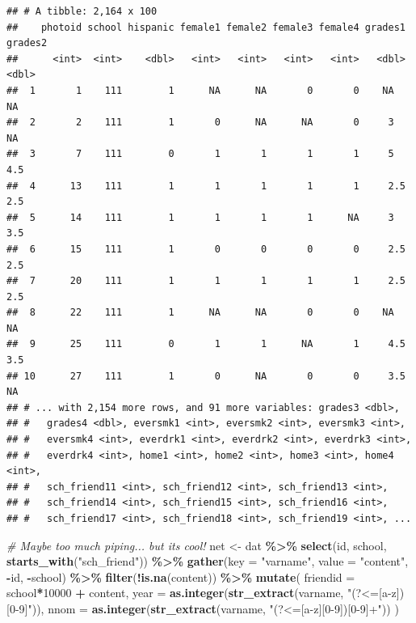 \documentclass[
]{book}
\newenvironment{Shaded}{\begin{snugshade}}{\end{snugshade}}
\newcommand{\AttributeTok}[1]{\textcolor[rgb]{0.13,0.29,0.53}{#1}}
\newcommand{\CommentTok}[1]{\textcolor[rgb]{0.56,0.35,0.01}{\textit{#1}}}
\newcommand{\DecValTok}[1]{\textcolor[rgb]{0.00,0.00,0.81}{#1}}
\newcommand{\FunctionTok}[1]{\textcolor[rgb]{0.13,0.29,0.53}{\textbf{#1}}}
\newcommand{\NormalTok}[1]{#1}
\newcommand{\OtherTok}[1]{\textcolor[rgb]{0.56,0.35,0.01}{#1}}
\newcommand{\SpecialCharTok}[1]{\textcolor[rgb]{0.81,0.36,0.00}{\textbf{#1}}}
\newcommand{\StringTok}[1]{\textcolor[rgb]{0.31,0.60,0.02}{#1}}
\begin{document}
\begin{verbatim}
## # A tibble: 2,164 x 100
##    photoid school hispanic female1 female2 female3 female4 grades1 grades2
##      <int>  <int>    <dbl>   <int>   <int>   <int>   <int>   <dbl>   <dbl>
##  1       1    111        1      NA      NA       0       0    NA      NA  
##  2       2    111        1       0      NA      NA       0     3      NA  
##  3       7    111        0       1       1       1       1     5       4.5
##  4      13    111        1       1       1       1       1     2.5     2.5
##  5      14    111        1       1       1       1      NA     3       3.5
##  6      15    111        1       0       0       0       0     2.5     2.5
##  7      20    111        1       1       1       1       1     2.5     2.5
##  8      22    111        1      NA      NA       0       0    NA      NA  
##  9      25    111        0       1       1      NA       1     4.5     3.5
## 10      27    111        1       0      NA       0       0     3.5    NA  
## # ... with 2,154 more rows, and 91 more variables: grades3 <dbl>,
## #   grades4 <dbl>, eversmk1 <int>, eversmk2 <int>, eversmk3 <int>,
## #   eversmk4 <int>, everdrk1 <int>, everdrk2 <int>, everdrk3 <int>,
## #   everdrk4 <int>, home1 <int>, home2 <int>, home3 <int>, home4 <int>,
## #   sch_friend11 <int>, sch_friend12 <int>, sch_friend13 <int>,
## #   sch_friend14 <int>, sch_friend15 <int>, sch_friend16 <int>,
## #   sch_friend17 <int>, sch_friend18 <int>, sch_friend19 <int>, ...
\end{verbatim}

\begin{Shaded}
\begin{Highlighting}[]
\CommentTok{\# Maybe too much piping... but its cool!}
\NormalTok{net }\OtherTok{\textless{}{-}}\NormalTok{ dat }\SpecialCharTok{\%\textgreater{}\%} 
  \FunctionTok{select}\NormalTok{(id, school, }\FunctionTok{starts\_with}\NormalTok{(}\StringTok{"sch\_friend"}\NormalTok{)) }\SpecialCharTok{\%\textgreater{}\%}
  \FunctionTok{gather}\NormalTok{(}\AttributeTok{key =} \StringTok{"varname"}\NormalTok{, }\AttributeTok{value =} \StringTok{"content"}\NormalTok{, }\SpecialCharTok{{-}}\NormalTok{id, }\SpecialCharTok{{-}}\NormalTok{school) }\SpecialCharTok{\%\textgreater{}\%}
  \FunctionTok{filter}\NormalTok{(}\SpecialCharTok{!}\FunctionTok{is.na}\NormalTok{(content)) }\SpecialCharTok{\%\textgreater{}\%}
  \FunctionTok{mutate}\NormalTok{(}
    \AttributeTok{friendid =}\NormalTok{ school}\SpecialCharTok{*}\DecValTok{10000} \SpecialCharTok{+}\NormalTok{ content,}
    \AttributeTok{year     =} \FunctionTok{as.integer}\NormalTok{(}\FunctionTok{str\_extract}\NormalTok{(varname, }\StringTok{"(?\textless{}=[a{-}z])[0{-}9]"}\NormalTok{)),}
    \AttributeTok{nnom     =} \FunctionTok{as.integer}\NormalTok{(}\FunctionTok{str\_extract}\NormalTok{(varname, }\StringTok{"(?\textless{}=[a{-}z][0{-}9])[0{-}9]+"}\NormalTok{))}
\NormalTok{  )}
\end{Highlighting}
\end{Shaded}
\end{document}
